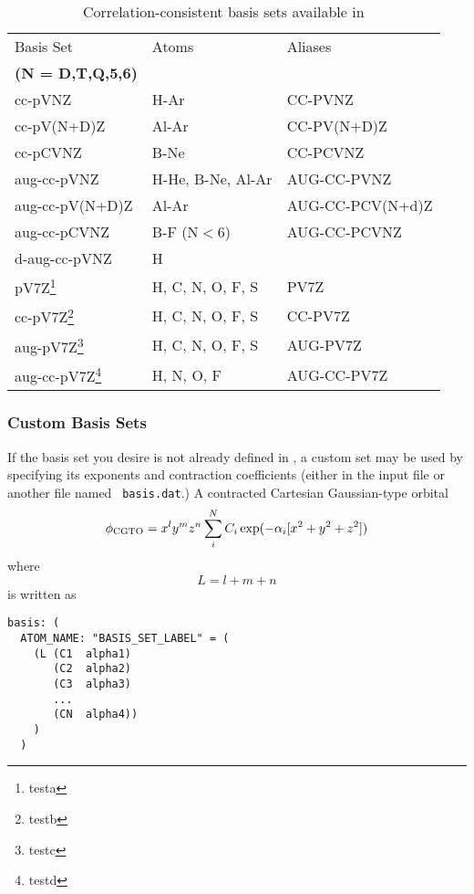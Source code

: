 \begin{table}[tbp]
\caption{Correlation-consistent basis sets available in \PSIthree}
\label{table:ccbasis}
\begin{center}
\begin{tabular}{|l|l|l|}
\hline
\hline
Basis Set 		&Atoms   	&Aliases\\ 
\textbf{ (N = D,T,Q,5,6)}	&			&	\\
\hline
	cc-pVNZ			& H-Ar			&CC-PVNZ\\
	cc-pV(N+D)Z		& Al-Ar			&CC-PV(N+D)Z\\
        cc-pCVNZ                & B-Ne                  &CC-PCVNZ\\
	aug-cc-pVNZ		& H-He, B-Ne, Al-Ar	&AUG-CC-PVNZ\\
	aug-cc-pV(N+D)Z		& Al-Ar			&AUG-CC-PCV(N+d)Z\\
	aug-cc-pCVNZ    	& B-F (N${<}$6)		&AUG-CC-PCVNZ\\
	d-aug-cc-pVNZ		& H			&\\
	pV7Z\footnote{testa}	& H, C, N, O, F, S	&PV7Z\\
	cc-pV7Z\footnote{testb}	& H, C, N, O, F, S	&CC-PV7Z\\
	aug-pV7Z\footnote{testc}     & H, C, N, O, F, S	&AUG-PV7Z\\
	aug-cc-pV7Z\footnote{testd}  & H, N, O, F            &AUG-CC-PV7Z\\
\hline
\hline
\end{tabular}
\end{center}
\end{table}

\subsubsection{Custom Basis Sets} \label{custom-basis}

If the basis set you desire is not already defined in \PSIthree, a
custom set may be used by specifying its exponents and contraction
coefficients (either in the input file or another file named {\tt
basis.dat}.) A contracted Cartesian Gaussian-type orbital
\begin{equation}
\phi_{\rm CGTO} =  x^ly^mz^n\sum_i^N C_i \exp(-\alpha_i[x^2+y^2+z^2])
\end{equation}
where
\begin{equation}
L = l+m+n
\end{equation}
is written as
\begin{verbatim}
basis: (
  ATOM_NAME: "BASIS_SET_LABEL" = (
    (L (C1  alpha1)
       (C2  alpha2)
       (C3  alpha3)
       ...
       (CN  alpha4))   
    )
  )
\end{verbatim}

